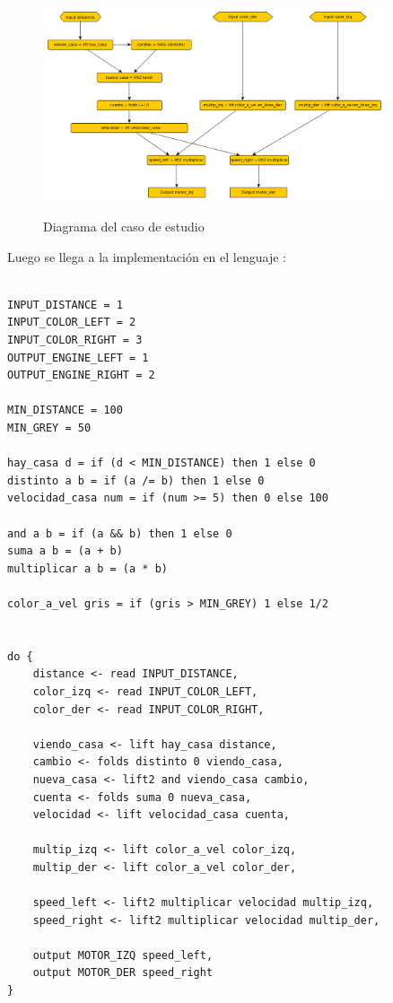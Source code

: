\begin{figure}[hbtp]
\begin{center}
\caption{Diagrama del caso de estudio}
\includegraphics[width=0.9\textwidth]{graphs/delivery.png}
\label{fig:delivery}
\end{center}
\end{figure}


Luego se llega a la implementación en el lenguaje \frob{}:

\begin{verbatim}

INPUT_DISTANCE = 1
INPUT_COLOR_LEFT = 2
INPUT_COLOR_RIGHT = 3
OUTPUT_ENGINE_LEFT = 1
OUTPUT_ENGINE_RIGHT = 2

MIN_DISTANCE = 100
MIN_GREY = 50

hay_casa d = if (d < MIN_DISTANCE) then 1 else 0
distinto a b = if (a /= b) then 1 else 0
velocidad_casa num = if (num >= 5) then 0 else 100

and a b = if (a && b) then 1 else 0
suma a b = (a + b)
multiplicar a b = (a * b)

color_a_vel gris = if (gris > MIN_GREY) 1 else 1/2


do {
    distance <- read INPUT_DISTANCE,
    color_izq <- read INPUT_COLOR_LEFT,
    color_der <- read INPUT_COLOR_RIGHT,

    viendo_casa <- lift hay_casa distance,
    cambio <- folds distinto 0 viendo_casa,
    nueva_casa <- lift2 and viendo_casa cambio,
    cuenta <- folds suma 0 nueva_casa,
    velocidad <- lift velocidad_casa cuenta,

    multip_izq <- lift color_a_vel color_izq,
    multip_der <- lift color_a_vel color_der,

    speed_left <- lift2 multiplicar velocidad multip_izq,
    speed_right <- lift2 multiplicar velocidad multip_der,

    output MOTOR_IZQ speed_left,
    output MOTOR_DER speed_right
}

\end{verbatim}

